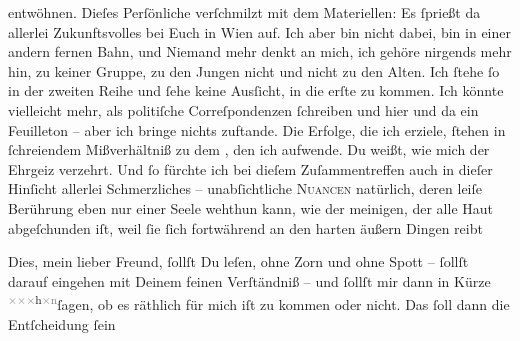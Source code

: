                    entwöhnen. Dieſes Perſönliche verſchmilzt mit dem Materiellen: Es{ }ſprießt da
               allerlei Zukunftsvolles bei Euch in Wien auf. Ich
               aber bin nicht dabei, bin in einer andern fernen Bahn, und Niemand mehr denkt an
               mich, ich gehöre nirgends mehr hin, zu keiner Gruppe, zu den Jungen nicht und nicht
               zu den Alten. Ich{ }ſtehe{ }ſo {\pb}in der zweiten Reihe und{ }ſehe keine Ausſicht, in die erſte zu kommen. Ich könnte vielleicht mehr, als
               politiſche Correſpondenzen{ }ſchreiben und hier und da ein Feuilleton – aber ich bringe
               nichts zuftande. Die Erfolge, die ich erziele,{ }ſtehen in{ }ſchreiendem Mißverhältniß zu
               dem \label{K_L02608-4v}\label{K_L02608-4}, den
               ich aufwende. Du weißt, wie mich der Ehrgeiz verzehrt.  Und{ }ſo fürchte ich bei dieſem Zuſammentreffen auch in dieſer Hinſicht
               allerlei Schmerzliches – unabſichtliche \textsc{Nuancen} natürlich,
                   deren leiſe Berührung eben nur einer Seele
               wehthun  kann, wie der meinigen, der alle Haut
               abgeſchunden iſt, weil{ }ſie{ }ſich fortwährend an den harten {\pb}äußern Dingen reibt{\dotsfive}\pend
           
\pstart
           Dies, mein lieber Freund,{ }ſollſt Du leſen, ohne Zorn und ohne Spott –{ }ſollſt darauf
               eingehen mit Deinem feinen Verſtändniß – und{ }ſollſt mir dann in Kürze \substVorne{}\textsuperscript{\textcolor{gray}{×}\-\textcolor{gray}{×}\-\textcolor{gray}{×}h\textcolor{gray}{×}\textcolor{gray}{n}}\substDazwischen{}ſagen\substHinten{}, ob  es räthlich für mich iſt zu kommen
               oder nicht. Das{ }ſoll dann die Entſcheidung{ }ſein{\dotsfour}\pend
           
